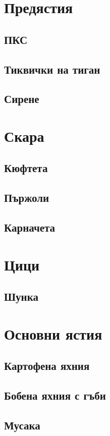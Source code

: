 \documentclass{article}
\begin{document}
\section{Предястия}
    \subsection{ПКС}
    \subsection{Тиквички на тиган}
    \subsection{Сирене}

\section{Скара}
    \subsection{Кюфтета}
    \subsection{Пържоли}
    \subsection{Карначета}

\section{Цици}
    \subsection{Шунка}

\section{Основни ястия}
    \subsection{Картофена яхния}
    \subsection{Бобена яхния с гъби}
    \subsection{Мусака}
\end{document}
